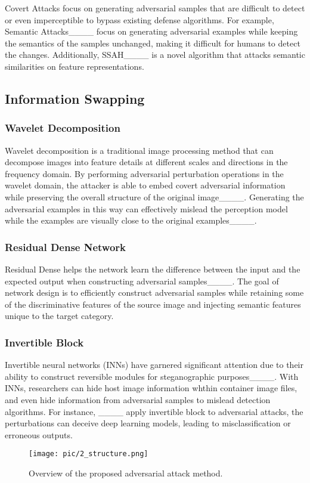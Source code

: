 Covert Attacks focus on generating adversarial samples that are difficult to detect or even imperceptible to bypass existing defense algorithms. For example, Semantic Attacks____ focus on generating adversarial examples while keeping the semantics of the samples unchanged, making it difficult for humans to detect the changes. Additionally, SSAH____ is a novel algorithm that attacks semantic similarities on feature representations.

\subsection{Information Swapping}

\subsubsection{Wavelet Decomposition}

Wavelet decomposition is a traditional image processing method that can decompose images into feature details at different scales and directions in the frequency domain. By performing adversarial perturbation operations in the wavelet domain, the attacker is able to embed covert adversarial information while preserving the overall structure of the original image____. Generating the adversarial examples in this way can effectively mislead the perception model while the examples are visually close to the original examples____.

\subsubsection{Residual Dense Network}

Residual Dense helps the network learn the difference between the input and the expected output when constructing adversarial samples____. The goal of network design is to efficiently construct adversarial samples while retaining some of the discriminative features of the source image and injecting semantic features unique to the target category.

\subsubsection{Invertible Block}

Invertible neural networks (INNs) have garnered significant attention due to their ability to construct reversible modules for steganographic purposes____. With INNs, researchers can hide host image information whthin container image files, and even hide information from adversarial samples to mislead detection algorithms. For instance, ____ apply invertible block to adversarial attacks, the perturbations can deceive deep learning models, leading to misclassification or erroneous outputs.



\begin{figure*}[htbp!]
\centering
\texttt{[image: pic/2\_structure.png]}
\caption{Overview of the proposed adversarial attack method.}
\label{2_structure}
\vspace{-6 mm} 
\end{figure*}